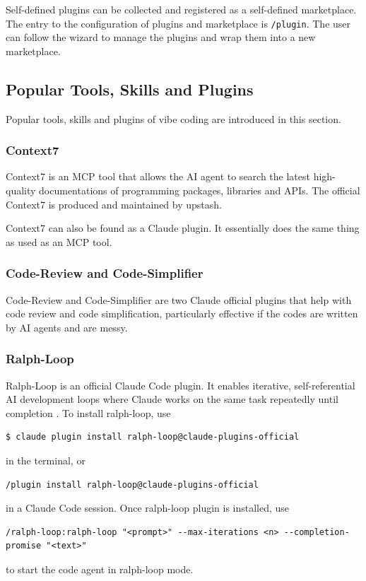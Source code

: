Self-defined plugins can be collected and registered as a self-defined marketplace. The entry to the configuration of plugins and marketplace is \verb|/plugin|. The user can follow the wizard to manage the plugins and wrap them into a new marketplace.

\subsection{Popular Tools, Skills and Plugins}

Popular tools, skills and plugins of vibe coding are introduced in this section.

\subsubsection*{Context7}

Context7 is an MCP tool that allows the AI agent to search the latest high-quality documentations of programming packages, libraries and APIs. The official Context7 is produced and maintained by upstash.

Context7 can also be found as a Claude plugin. It essentially does the same thing as used as an MCP tool.

\subsubsection*{Code-Review and Code-Simplifier}

Code-Review and Code-Simplifier are two Claude official plugins that help with code review and code simplification, particularly effective if the codes are written by AI agents and are messy.

\subsubsection*{Ralph-Loop}

Ralph-Loop is an official Claude Code plugin. It enables iterative, self-referential AI development loops where Claude works on the same task repeatedly until completion \cite{anthropic2026ralphLoop}. To install ralph-loop, use
\begin{lstlisting}
$ claude plugin install ralph-loop@claude-plugins-official
\end{lstlisting}
in the terminal, or
\begin{lstlisting}
/plugin install ralph-loop@claude-plugins-official
\end{lstlisting}
in a Claude Code session. Once ralph-loop plugin is installed, use
\begin{lstlisting}
/ralph-loop:ralph-loop "<prompt>" --max-iterations <n> --completion-promise "<text>"
\end{lstlisting}
to start the code agent in ralph-loop mode.

